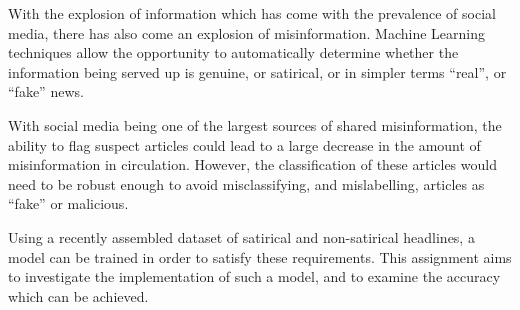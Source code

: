 With the explosion of information which has come with the prevalence of social
media, there has also come an explosion of misinformation. Machine Learning
techniques allow the opportunity to automatically determine whether the
information being served up is genuine, or satirical, or in simpler terms
``real'', or ``fake'' news.

\par With social media being one of the largest sources of shared misinformation, the
ability to flag suspect articles could lead to a large decrease in the amount of
misinformation in circulation. However, the classification of these articles
would need to be robust enough to avoid misclassifying, and mislabelling,
articles as ``fake'' or malicious.

\par Using a recently assembled dataset of satirical and non-satirical
headlines, a model can be trained in order to satisfy these requirements. This
assignment aims to investigate the implementation of such a model, and to
examine the accuracy which can be achieved.
